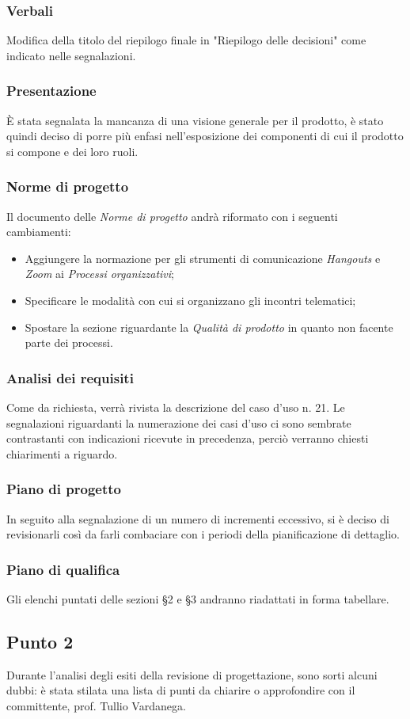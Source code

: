         \subsubsection{Verbali}
            Modifica della titolo del riepilogo finale in "Riepilogo delle decisioni" come indicato nelle segnalazioni.
        \subsubsection{Presentazione}
            È stata segnalata la mancanza di una visione generale per il prodotto, è stato quindi deciso di porre più enfasi nell'esposizione dei componenti di cui il prodotto si compone e dei loro ruoli.
        \subsubsection{Norme di progetto}
            Il documento delle \textit{Norme di progetto} andrà riformato con i seguenti cambiamenti:
            \begin{itemize}
                \item Aggiungere la normazione per gli strumenti di comunicazione \textit{Hangouts} e \textit{Zoom} ai \textit{Processi organizzativi};
                \item  Specificare le modalità con cui si organizzano gli incontri telematici;
                \item Spostare la sezione riguardante la \textit{Qualità di prodotto} in quanto non facente parte dei processi.
            \end{itemize}
        \subsubsection{Analisi dei requisiti}
            Come da richiesta, verrà rivista la descrizione del caso d'uso n. 21. Le segnalazioni riguardanti la numerazione dei casi d'uso ci sono sembrate contrastanti con indicazioni ricevute in precedenza, perciò verranno chiesti chiarimenti a riguardo.
        \subsubsection{Piano di progetto}
            In seguito alla segnalazione di un numero di incrementi eccessivo, si è deciso di revisionarli così da farli combaciare con i periodi della pianificazione di dettaglio.
        \subsubsection{Piano di qualifica}
            Gli elenchi puntati delle sezioni §2 e §3 andranno riadattati in forma tabellare.
    \subsection{Punto 2}
        Durante l'analisi degli esiti della revisione di progettazione, sono sorti alcuni dubbi: è stata stilata una lista di punti da chiarire o approfondire con il committente, prof. Tullio Vardanega.
